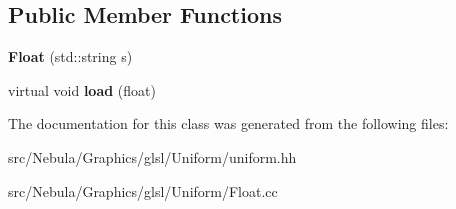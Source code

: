 \subsection*{\-Public \-Member \-Functions}
\begin{DoxyCompactItemize}
\item 
\hypertarget{classNeb_1_1glsl_1_1Uniform_1_1Scalar_1_1Float_a98cbc3f3264a8c007ae4bc942a0e552a}{{\bfseries \-Float} (std\-::string s)}\label{classNeb_1_1glsl_1_1Uniform_1_1Scalar_1_1Float_a98cbc3f3264a8c007ae4bc942a0e552a}

\item 
\hypertarget{classNeb_1_1glsl_1_1Uniform_1_1Scalar_1_1Float_a3e02efd7a02e8714a89dff10459dc47b}{virtual void {\bfseries load} (float)}\label{classNeb_1_1glsl_1_1Uniform_1_1Scalar_1_1Float_a3e02efd7a02e8714a89dff10459dc47b}

\end{DoxyCompactItemize}


\-The documentation for this class was generated from the following files\-:\begin{DoxyCompactItemize}
\item 
src/\-Nebula/\-Graphics/glsl/\-Uniform/uniform.\-hh\item 
src/\-Nebula/\-Graphics/glsl/\-Uniform/\-Float.\-cc\end{DoxyCompactItemize}
